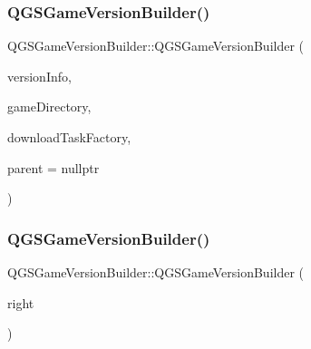 \subsubsection{\texorpdfstring{Q\+G\+S\+Game\+Version\+Builder()}{QGSGameVersionBuilder()}\hspace{0.1cm}{\footnotesize\ttfamily [1/3]}}
{\footnotesize\ttfamily Q\+G\+S\+Game\+Version\+Builder\+::\+Q\+G\+S\+Game\+Version\+Builder (\begin{DoxyParamCaption}\item[{\mbox{\hyperlink{class_q_g_s_game_version_info}{Q\+G\+S\+Game\+Version\+Info}} \&}]{version\+Info,  }\item[{\mbox{\hyperlink{class_q_g_s_game_directory}{Q\+G\+S\+Game\+Directory}} $\ast$}]{game\+Directory,  }\item[{\mbox{\hyperlink{class_q_g_s_download_task_factory}{Q\+G\+S\+Download\+Task\+Factory}} $\ast$}]{download\+Task\+Factory,  }\item[{Q\+Object $\ast$}]{parent = {\ttfamily nullptr} }\end{DoxyParamCaption})}

\mbox{\label{class_q_g_s_game_version_builder_aaf62a4dc64e49091bf3f18e317d5b864}} 
\subsubsection{\texorpdfstring{Q\+G\+S\+Game\+Version\+Builder()}{QGSGameVersionBuilder()}\hspace{0.1cm}{\footnotesize\ttfamily [2/3]}}
{\footnotesize\ttfamily Q\+G\+S\+Game\+Version\+Builder\+::\+Q\+G\+S\+Game\+Version\+Builder (\begin{DoxyParamCaption}\item[{const \mbox{\hyperlink{class_q_g_s_game_version_builder}{Q\+G\+S\+Game\+Version\+Builder}} \&}]{right }\end{DoxyParamCaption})\hspace{0.3cm}{\ttfamily [delete]}}

\mbox{\label{class_q_g_s_game_version_builder_a72efb98f016173c2d6507f720f8b39d4}} 
